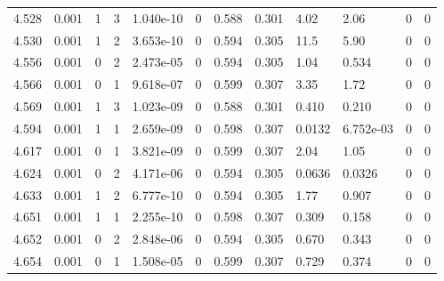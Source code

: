 \documentclass[preview]{standalone}
\begin{document}
{{{{{{{{{{\begin{tabular}{L{1.2cm}C{1.2cm} C{0.3cm}C{0.5cm} C{1.4cm}C{1.4cm} C{1.4cm}C{1.4cm} C{1.6cm}C{1.6cm} C{1.6cm}C{1.6cm}}
  4.528  &  0.001  & 1     &  3 &  1.040e-10  & 0  &  0.588&   0.301& 4.02 & 2.06   &  0 & 0  \\ 
  4.530  &  0.001  & 1     &  2 &  3.653e-10  & 0  &  0.594&   0.305& 11.5 & 5.90   &  0 & 0  \\ 
  4.556  &  0.001  & 0     &  2 &  2.473e-05  & 0  &  0.594&   0.305& 1.04 & 0.534   &  0 & 0  \\ 
  4.566  &  0.001  & 0     &  1 &  9.618e-07  & 0  &  0.599&   0.307& 3.35 & 1.72   &  0 & 0  \\ 
  4.569  &  0.001  & 1     &  3 &  1.023e-09  & 0  &  0.588&   0.301& 0.410 & 0.210   &  0 & 0  \\ 
  4.594  &  0.001  & 1     &  1 &  2.659e-09  & 0  &  0.598&   0.307& 0.0132 & 6.752e-03   &  0 & 0  \\ 
  4.617  &  0.001  & 0     &  1 &  3.821e-09  & 0  &  0.599&   0.307& 2.04 & 1.05   &  0 & 0  \\ 
  4.624  &  0.001  & 0     &  2 &  4.171e-06  & 0  &  0.594&   0.305& 0.0636 & 0.0326   &  0 & 0  \\ 
  4.633  &  0.001  & 1     &  2 &  6.777e-10  & 0  &  0.594&   0.305& 1.77 & 0.907   &  0 & 0  \\ 
  4.651  &  0.001  & 1     &  1 &  2.255e-10  & 0  &  0.598&   0.307& 0.309 & 0.158   &  0 & 0  \\ 
  4.652  &  0.001  & 0     &  2 &  2.848e-06  & 0  &  0.594&   0.305& 0.670 & 0.343   &  0 & 0  \\ 
  4.654  &  0.001  & 0     &  1 &  1.508e-05  & 0  &  0.599&   0.307& 0.729 & 0.374   &  0 & 0  \\ 
\hline 
\end{tabular} 

}}}}}}}}}}
\end{document}
